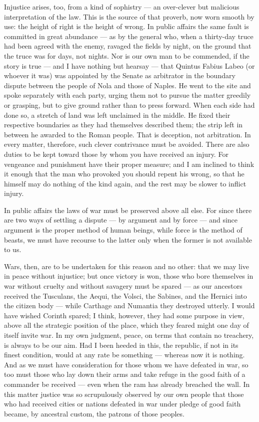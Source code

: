  Injustice arises, too, from a kind of sophistry — an over-clever but malicious interpretation of the law. This is the source of that proverb, now worn smooth by use: the height of right is the height of wrong. In public affairs the same fault is committed in great abundance — as by the general who, when a thirty-day truce had been agreed with the enemy, ravaged the fields by night, on the ground that the truce was for days, not nights. Nor is our own man to be commended, if the story is true — and I have nothing but hearsay — that Quintus Fabius Labeo (or whoever it was) was appointed by the Senate as arbitrator in the boundary dispute between the people of Nola and those of Naples. He went to the site and spoke separately with each party, urging them not to pursue the matter greedily or grasping, but to give ground rather than to press forward. When each side had done so, a stretch of land was left unclaimed in the middle. He fixed their respective boundaries as they had themselves described them; the strip left in between he awarded to the Roman people. That is deception, not arbitration. In every matter, therefore, such clever contrivance must be avoided. There are also duties to be kept toward those by whom you have received an injury. For vengeance and punishment have their proper measure; and I am inclined to think it enough that the man who provoked you should repent his wrong, so that he himself may do nothing of the kind again, and the rest may be slower to inflict injury.

 In public affairs the laws of war must be preserved above all else. For since there are two ways of settling a dispute — by argument and by force — and since argument is the proper method of human beings, while force is the method of beasts, we must have recourse to the latter only when the former is not available to us.

 Wars, then, are to be undertaken for this reason and no other: that we may live in peace without injustice; but once victory is won, those who bore themselves in war without cruelty and without savagery must be spared — as our ancestors received the Tusculans, the Aequi, the Volsci, the Sabines, and the Hernici into the citizen body — while Carthage and Numantia they destroyed utterly. I would have wished Corinth spared; I think, however, they had some purpose in view, above all the strategic position of the place, which they feared might one day of itself invite war. In my own judgment, peace, on terms that contain no treachery, is always to be our aim. Had I been heeded in this, the republic, if not in its finest condition, would at any rate be something — whereas now it is nothing. And as we must have consideration for those whom we have defeated in war, so too must those who lay down their arms and take refuge in the good faith of a commander be received — even when the ram has already breached the wall. In this matter justice was so scrupulously observed by our own people that those who had received cities or nations defeated in war under pledge of good faith became, by ancestral custom, the patrons of those peoples.

